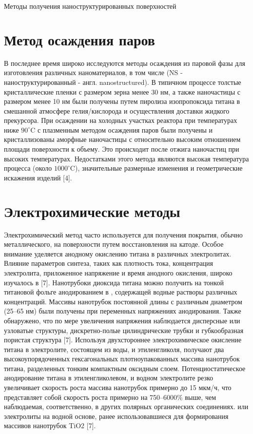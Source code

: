 \documentclass[oneside,final,12pt]{extreport}
\begin{document}
\begin{chapter} {Методы получения наноструктурированных поверхностей }
\section{Метод осаждения паров}
В последнее время широко исследуются методы осаждения из паровой фазы для изготовления различных наноматериалов, в том числе  (NS - наноструктурированный - англ. nanostructured). В типичном процессе толстые кристаллические пленки  с размером зерна менее 30 нм, а также наночастицы  с размером менее 10 нм были получены путем пиролиза изопропоксида титана в смешанной атмосфере гелия/кислорода и осуществления доставки жидкого прекурсора. При осаждении на холодных участках реактора при температурах ниже $90^{\circ}$C с плазменным методом осаждения паров были получены и кристаллизованы аморфные наночастицы  с относительно высоким отношением площади поверхности к объему. Это происходит после отжига наночастиц при высоких температурах. Недостатками этого метода являются высокая температура процесса (около $1000^{\circ}$C), значительные размерные изменения и геометрические искажения изделий [4].

\section{Электрохимические методы}

Электрохимический метод часто используется для получения покрытия, обычно металлического, на поверхности путем восстановления на катоде. Особое внимание уделяется анодному окислению титана в различных электролитах. Влияние параметров синтеза, таких как плотность тока, концентрация электролита, приложенное напряжение и время анодного окисления, широко изучалось в [7]. Нанотрубоки диоксида титана можно получить на тонкой титановой фольге анодированием в , содержащей водные растворы различных концентраций. Массивы нанотрубок постоянной длины с различным диаметром (25–65 нм) были получены при переменных напряжениях анодирования. Также обнаружено, что по мере увеличения напряжения наблюдается дисперсные или узловатые структуры, дискретно-полые цилиндрические трубки и губкообразная пористая структура [7]. Используя двухстороннее электрохимическое окисление титана в электролите, состоящем из воды,  и этиленгликоля, получают два высокоупорядоченных гексагональных плотноупакованных массива нанотрубок титана, разделенных тонким компактным оксидным слоем. Потенциостатическое анодирование титана в этиленгликолевом,  и водном электролите резко увеличивает скорость роста массива нанотрубок примерно до 15 мкм/ч, что представляет собой скорость роста примерно на 750–6000\% выше, чем наблюдаемая, соответственно, в других полярных органических соединениях. или электролиты на водной основе, ранее использовавшиеся для формирования массивов нанотрубок TiO2 [7].
\end{chapter}
\end{document}

